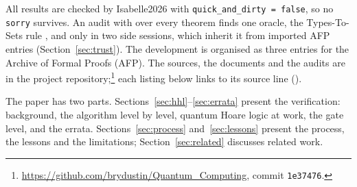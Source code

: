 All results are checked by Isabelle2026 with \texttt{quick\_and\_dirty = false}, so no
\texttt{sorry} survives. An audit with  over every theorem finds one
oracle, the Types-To-Sets rule , and only in two side sessions, which
inherit it from imported AFP entries (Section~\ref{sec:trust}). The development is organised as
three entries for the Archive of Formal Proofs (AFP). The sources, the documents and the audits are
in the project repository;\footnote{\url{https://github.com/brydustin/Quantum_Computing}, commit
\texttt{1e37476}.} each listing below links to its source line (\isalogo).

The paper has two parts. Sections~\ref{sec:hhl}--\ref{sec:errata} present the verification: background,
the algorithm level by level, quantum Hoare logic at work, the gate level, and the errata.
Sections~\ref{sec:process} and~\ref{sec:lessons} present the process, the lessons and the limitations;
Section~\ref{sec:related} discusses related work.
